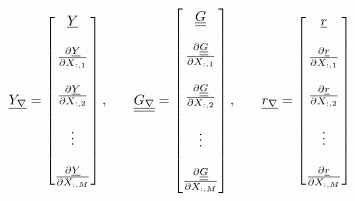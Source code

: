 \begin{displaymath}
\underline{Y_{\nabla}}=\begin{bmatrix} 
\underline{Y} \\ \\
\frac{\partial \underline{Y}}{\partial X_{:,1}} \\ \\
\frac{\partial \underline{Y}}{\partial X_{:,2}} \\ \\ 
\vdots \\ \\
\frac{\partial \underline{Y}}{\partial X_{:,M}}
\end{bmatrix}, \hspace{0.25truein}
\underline{\underline{G_{\nabla}}}=\begin{bmatrix}
\underline{\underline{G}}\\ \\
\frac{\partial \underline{\underline{G}}}{\partial X_{:,1}}\\ \\
\frac{\partial \underline{\underline{G}}}{\partial X_{:,2}}\\ \\
\vdots \\ \\
\frac{\partial \underline{\underline{G}}}{\partial X_{:,M}}
\end{bmatrix}, \hspace{0.25truein}
\underline{r_{\nabla}}=\begin{bmatrix} 
\underline{r} \\ \\
\frac{\partial \underline{r}}{\partial X_{:,1}} \\ \\
\frac{\partial \underline{r}}{\partial X_{:,2}} \\ \\ 
\vdots \\ \\
\frac{\partial \underline{r}}{\partial X_{:,M}}
\end{bmatrix}
\end{displaymath}
